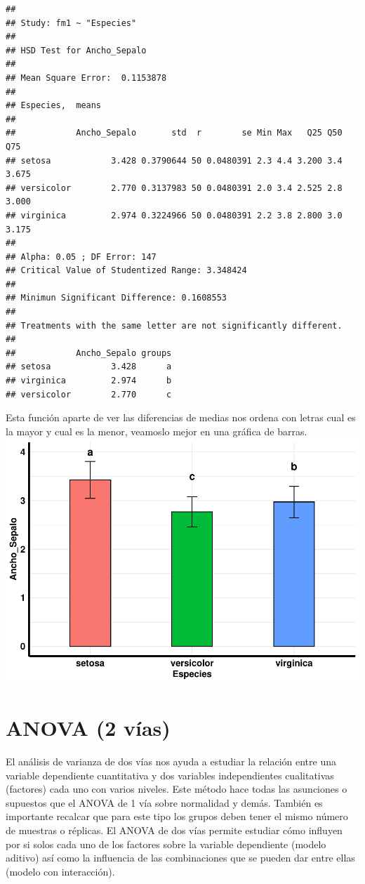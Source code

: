 \documentclass[
]{book}
\begin{document}
\begin{verbatim}
## 
## Study: fm1 ~ "Especies"
## 
## HSD Test for Ancho_Sepalo 
## 
## Mean Square Error:  0.1153878 
## 
## Especies,  means
## 
##            Ancho_Sepalo       std  r        se Min Max   Q25 Q50   Q75
## setosa            3.428 0.3790644 50 0.0480391 2.3 4.4 3.200 3.4 3.675
## versicolor        2.770 0.3137983 50 0.0480391 2.0 3.4 2.525 2.8 3.000
## virginica         2.974 0.3224966 50 0.0480391 2.2 3.8 2.800 3.0 3.175
## 
## Alpha: 0.05 ; DF Error: 147 
## Critical Value of Studentized Range: 3.348424 
## 
## Minimun Significant Difference: 0.1608553 
## 
## Treatments with the same letter are not significantly different.
## 
##            Ancho_Sepalo groups
## setosa            3.428      a
## virginica         2.974      b
## versicolor        2.770      c
\end{verbatim}

\hfill\break
Esta función aparte de ver las diferencias de medias nos ordena con letras cual es la mayor y cual es la menor, veamoslo mejor en una gráfica de barras.\\

\includegraphics{_main_files/figure-latex/unnamed-chunk-259-1.pdf}

\newpage

\section{ANOVA (2 vías)}\label{anova-2-vuxedas}

El análisis de varianza de dos vías nos ayuda a estudiar la relación entre una variable dependiente cuantitativa y dos variables independientes cualitativas (factores) cada uno con varios niveles.
Este método hace todas las asunciones o supuestos que el ANOVA de 1 vía sobre normalidad y demás.
También es importante recalcar que para este tipo los grupos deben tener el mismo número de muestras o réplicas.
El ANOVA de dos vías permite estudiar cómo influyen por si solos cada uno de los factores sobre la variable dependiente (modelo aditivo) así como la influencia de las combinaciones que se pueden dar entre ellas (modelo con interacción).
\end{document}
